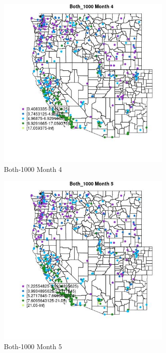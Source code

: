 \begin{figure} 
\centering  
\includegraphics[width=0.77\textwidth]{Code_Outputs/ML_input_report_ML_input_PM25_Step5_part_d_de_duplicated_aves_ML_input_MapObsMo4Both_1000.jpg} 
\caption{\label{fig:ML_input_report_ML_input_PM25_Step5_part_d_de_duplicated_aves_ML_inputMapObsMo4Both_1000}Both-1000 Month 4} 
\end{figure} 
 

\begin{figure} 
\centering  
\includegraphics[width=0.77\textwidth]{Code_Outputs/ML_input_report_ML_input_PM25_Step5_part_d_de_duplicated_aves_ML_input_MapObsMo5Both_1000.jpg} 
\caption{\label{fig:ML_input_report_ML_input_PM25_Step5_part_d_de_duplicated_aves_ML_inputMapObsMo5Both_1000}Both-1000 Month 5} 
\end{figure} 
 

